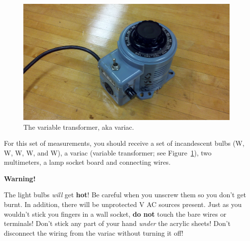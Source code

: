\documentclass[12pt]{article}
\begin{document}
\begin{figure}
  \centering
  \includegraphics[width=2\textwidth/3]{figures/variac}
  \caption{The variable transformer, aka variac.}
  \label{fig:variac}
\end{figure}
For this set of measurements, you should receive a set of incandescent
bulbs (\unit[25]{W}, \unit[40]{W}, \unit[60]{W}, \unit[75]{W}, and
\unit[100]{W}), a variac (variable transformer; see
Figure~\ref{fig:variac}), two multimeters, a lamp socket board and
connecting wires.

\begin{framed}
  \begin{center}
    {\Large
      \textbf{Warning!}}
  \end{center}
  The light bulbs \textit{will} get \textbf{hot}!  Be careful when you
  unscrew them so you don't get burnt.  In addition, there will be
  unprotected \unit[120]{V} AC sources present.  Just as you wouldn't
  stick you fingers in a wall socket, \textbf{do not} touch the bare
  wires or terminals!  Don't stick any part of your hand
  \textit{under} the acrylic sheets!  Don't disconnect the wiring from
  the variac without turning it off!
\end{framed}
\end{document}
